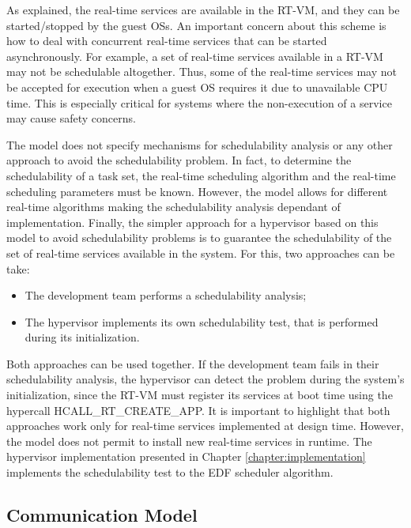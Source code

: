 As explained, the real-time services are available in the RT-VM, and they can be started/stopped by the guest OSs. An important concern about this scheme is how to deal with concurrent real-time services that can be started asynchronously. For example, a set of real-time services available in a RT-VM may not be schedulable altogether. Thus, some of the real-time services may not be accepted for execution when a guest OS requires it due to unavailable CPU time. This is especially critical for systems where the non-execution of a service may cause safety concerns. 

The model does not specify mechanisms for schedulability analysis or any other approach to avoid the schedulability problem. In fact, to determine the schedulability of a task set, the real-time scheduling algorithm and the real-time scheduling parameters must be known. However, the model allows for different real-time algorithms making the schedulability analysis dependant of implementation. Finally, the simpler approach for a hypervisor based on this model to avoid schedulability problems is to guarantee the schedulability of the set of real-time services available in the system. For this, two approaches can be take: 

\begin{itemize}
    \item The development team performs a schedulability analysis;
    \item The hypervisor implements its own schedulability test, that is performed during its initialization. 
\end{itemize}

Both approaches can be used together. If the development team fails in their schedulability analysis, the hypervisor can detect the problem during the system's initialization, since the RT-VM must register its services at boot time using the hypercall HCALL\_R\-T\_CREATE\_APP. It is important to highlight that both approaches work only for real-time services implemented at design time. However, the model does not permit to install new real-time services in runtime. The hypervisor implementation presented in Chapter \ref{chapter:implementation} implements the schedulability test to the EDF scheduler algorithm. 

\subsection{Communication Model}
\label{subsection4:comm}

